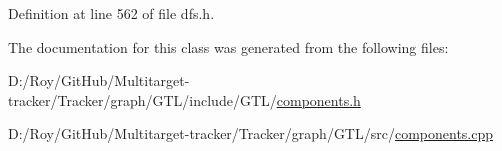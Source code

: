 Definition at line 562 of file dfs.\+h.



The documentation for this class was generated from the following files\+:\begin{DoxyCompactItemize}
\item 
D\+:/\+Roy/\+Git\+Hub/\+Multitarget-\/tracker/\+Tracker/graph/\+G\+T\+L/include/\+G\+T\+L/\mbox{\hyperlink{components_8h}{components.\+h}}\item 
D\+:/\+Roy/\+Git\+Hub/\+Multitarget-\/tracker/\+Tracker/graph/\+G\+T\+L/src/\mbox{\hyperlink{_g_t_l_2src_2components_8cpp}{components.\+cpp}}\end{DoxyCompactItemize}
